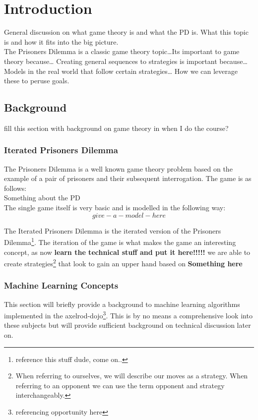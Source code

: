 
\chapter{Introduction}\label{ch:intro}

General discussion on what game theory is and what the PD is. What this topic is and how it fits into the big picture.\\

The Prisoners Dilemma is a classic game theory topic\ldots  Its important to game theory because\ldots  
Creating general sequences to strategies is important because\ldots 
Models in the real world that follow certain strategies\ldots  
How we can leverage these to peruse goals.

\section{Background}
fill this section with background on game theory in when I do the course?
\subsection{Iterated Prisoners Dilemma}\label{ssec:IPD}
The Prisoners Dilemma is a well known game theory problem based on the example of a pair of prisoners and their subsequent interrogation. The game is as follows:\\

Something about the PD \\

The single game itself is very basic and is modelled in the following way: \\

\[give-a-model-here\]

The Iterated Prisoners Dilemma is the iterated version of the Prisoners Dilemma\footnote{reference this stuff dude, come on..}. The iteration of the game is what makes the game an interesting concept, as now \textbf{learn the technical stuff and put it here!!!!!} we are able to create strategies\footnote{When referring to ourselves, we will describe our moves as a strategy. When referring to an opponent we can use the term opponent and strategy interchangeably.} that look to gain an upper hand based on \textbf{Something here}


\subsection{Machine Learning Concepts}
This section will briefly provide a background to machine learning algorithms implemented in the axelrod-dojo\footnote{referencing opportunity here}. This is by no means a comprehensive look into these subjects but will provide sufficient background on technical discussion later on.

